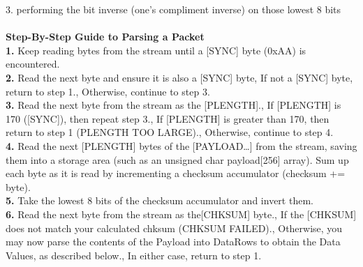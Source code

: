 \documentclass[a4 paper,12pt]{article}
\begin{document}
\begin{minipage}{0.98\textwidth}
3. performing the bit inverse (one's compliment inverse) on those lowest 8 bits\\\\  
\textbf{Step-By-Step Guide to Parsing a Packet}\\
\textbf{1.} Keep reading bytes from the stream until a [SYNC] byte (0xAA) is encountered.\\
\textbf{2.} Read the next byte and ensure it is also a [SYNC] byte, If not a [SYNC] byte, return to step 1., Otherwise, continue to step 3.\\
\textbf{3.} Read the next byte from the stream as the [PLENGTH].,  If [PLENGTH] is 170 ([SYNC]), then repeat step 3., If [PLENGTH] is greater than 170, then return to step 1 (PLENGTH TOO LARGE)., Otherwise, continue to step 4.\\
\textbf{4.} Read the next [PLENGTH] bytes of the [PAYLOAD…] from the stream, saving them into a storage area (such as an unsigned char payload[256] array). Sum up each byte as it is read by
incrementing a checksum accumulator (checksum += byte).\\
\textbf{5.} Take the lowest 8 bits of the checksum accumulator and invert them.\\
\textbf{6.} Read the next byte from the stream as the[CHKSUM] byte., If the [CHKSUM] does not match your calculated chksum (CHKSUM FAILED)., Otherwise, you may now parse the contents of the Payload into DataRows to obtain the Data
Values, as described below., In either case, return to step 1.\\\\
\end{minipage}
	
\end{document}
